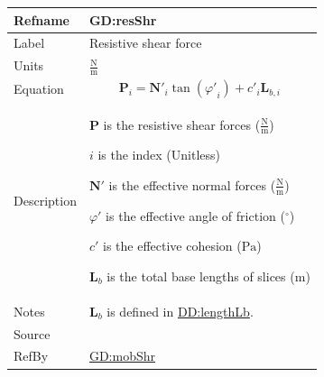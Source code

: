 \documentclass[12pt]{article}
\begin{document}
\medskip
\noindent
\begin{minipage}{\textwidth}
\begin{tabular}{>{\raggedright}p{}>{\raggedright\arraybackslash}p{}}
\toprule \textbf{Refname} & \textbf{GD:resShr}
\label{GD:resShr}
\\ \midrule
Label & Resistive shear force
        
\\ \midrule
Units & $\frac{\text{N}}{\text{m}}$
        
\\ \midrule
Equation & \begin{displaymath}
           {\symbf{P}}_{i}={\symbf{N'}}_{i} \tan\left({φ'}_{i}\right)+{c'}_{i} {\symbf{L}_{b,i}}
           \end{displaymath}
\\ \midrule
Description & \begin{symbDescription}
              \item{$\symbf{P}$ is the resistive shear forces ($\frac{\text{N}}{\text{m}}$)}
              \item{$i$ is the index (Unitless)}
              \item{$\symbf{N'}$ is the effective normal forces ($\frac{\text{N}}{\text{m}}$)}
              \item{$φ'$ is the effective angle of friction (${{}^{\circ}}$)}
              \item{$c'$ is the effective cohesion (${\text{Pa}}$)}
              \item{${\symbf{L}_{b}}$ is the total base lengths of slices (${\text{m}}$)}
              \end{symbDescription}
\\ \midrule
Notes & ${\symbf{L}_{b}}$ is defined in \hyperref[DD:lengthLb]{DD:lengthLb}.
        
\\ \midrule
Source & \cite{chen2005}
         
\\ \midrule
RefBy & \hyperref[GD:mobShr]{GD:mobShr}
        
\\ \bottomrule
\end{tabular}
\end{minipage}
\end{document}

